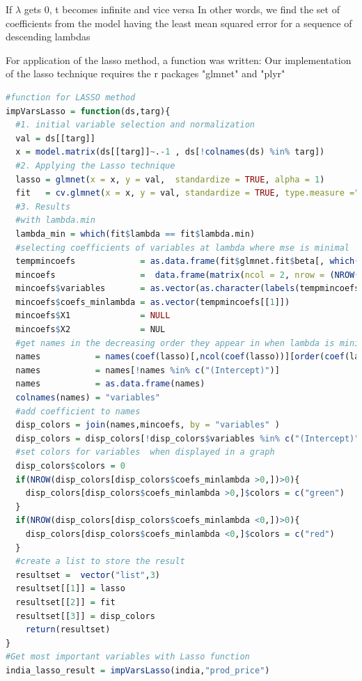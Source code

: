 \documentclass[11pt]{article}
\begin{document}
If $\lambda$ gets 0, t becomes infinite and vice versa
In other words, we find the set of coefficients from the model having the least mean squared error for  a sequence of descending lambdas

For application of the lasso method, a function was written:
Our implementation of the lasso technique requires the r packages "glmnet" and "plyr"

\begin{lstlisting}[language= R, captionpos=b,caption=\href{https://github.com/jaidikam/sps_ws1718/tree/master/Qfolder4}{SPL\_Q4\_india\_impvar\_lasso}]
#function for LASSO method   
impVarsLasso = function(ds,targ){
  #1. initial variable selection and normalization
  val = ds[[targ]]
  x = model.matrix(ds[[targ]]~.-1 , ds[!colnames(ds) %in% targ])
  #2. Applying the Lasso technique
  lasso = glmnet(x = x, y = val,  standardize = TRUE, alpha = 1)
  fit   = cv.glmnet(x = x, y = val, standardize = TRUE, type.measure ="mse", alpha=1, nfolds=3) 
  #3. Results
  #with lambda.min
  lambda_min = which(fit$lambda == fit$lambda.min) 
  #selecting coefficients of variables at lambda where mse is minimal
  tempmincoefs             = as.data.frame(fit$glmnet.fit$beta[, which(fit$lambda == fit$lambda.min)])
  mincoefs                 =  data.frame(matrix(ncol = 2, nrow = (NROW(tempmincoefs))))
  mincoefs$variables       = as.vector(as.character(labels(tempmincoefs)[[1]]))
  mincoefs$coefs_minlambda = as.vector(tempmincoefs[[1]])
  mincoefs$X1              = NULL
  mincoefs$X2              = NUL 
  #get names in the decreasing order they appear in when lambda is minimal
  names           = names(coef(lasso)[,ncol(coef(lasso))][order(coef(lasso)[,ncol(coef(lasso))],decreasing=TRUE)])
  names           = names[!names %in% c("(Intercept)")]
  names           = as.data.frame(names)
  colnames(names) = "variables" 
  #add coefficient to names
  disp_colors = join(names,mincoefs, by = "variables" )
  disp_colors = disp_colors[!disp_colors$variables %in% c("(Intercept)"),] 
  #set colors for variables  when displayed in a graph
  disp_colors$colors = 0
  if(NROW(disp_colors[disp_colors$coefs_minlambda >0,])>0){
    disp_colors[disp_colors$coefs_minlambda >0,]$colors = c("green")
  }
  if(NROW(disp_colors[disp_colors$coefs_minlambda <0,])>0){
    disp_colors[disp_colors$coefs_minlambda <0,]$colors = c("red")
  }  
  #create a list to store the result
  resultset =  vector("list",3)
  resultset[[1]] = lasso
  resultset[[2]] = fit
  resultset[[3]] = disp_colors
    return(resultset)
}
#Get most important variables with Lasso function
india_lasso_result = impVarsLasso(india,"prod_price")
\end{lstlisting}
\end{document}
